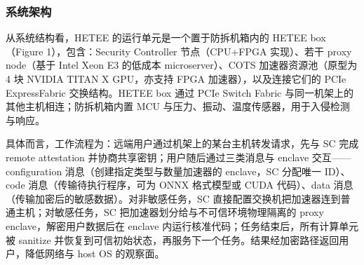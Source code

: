 \documentclass[11pt]{ctexart}
\begin{document}
\subsubsection{系统架构}
从系统结构看，HETEE 的运行单元是一个置于防拆机箱内的 HETEE box（Figure 1），包含：Security Controller 节点（CPU+FPGA 实现）、若干 proxy node（基于 Intel Xeon E3 的低成本 microserver）、COTS 加速器资源池（原型为 4 块 NVIDIA TITAN X GPU，亦支持 FPGA 加速器），以及连接它们的 PCIe ExpressFabric 交换结构。HETEE box 通过 PCIe Switch Fabric 与同一机架上的其他主机相连；防拆机箱内置 MCU 与压力、振动、温度传感器，用于入侵检测与响应。\par
具体而言，工作流程为：远端用户通过机架上的某台主机转发请求，先与 SC 完成 remote attestation 并协商共享密钥；用户随后通过三类消息与 enclave 交互——configuration 消息（创建指定类型与数量加速器的 enclave，SC 分配唯一 ID）、code 消息（传输待执行程序，可为 ONNX 格式模型或 CUDA 代码）、data 消息（传输加密后的敏感数据）。对非敏感任务，SC 直接配置交换机把加速器连到普通主机；对敏感任务，SC 把加速器划分给与不可信环境物理隔离的 proxy enclave，解密用户数据后在 enclave 内运行核准代码；任务结束后，所有计算单元被 sanitize 并恢复到可信初始状态，再服务下一个任务。结果经加密路径返回用户，降低网络与 host OS 的观察面。\par
\end{document}
